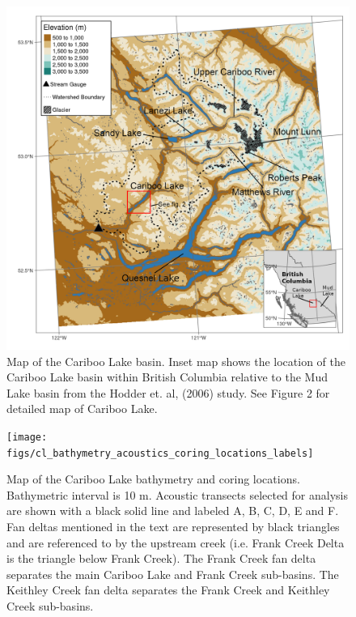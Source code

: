 \documentclass[Royal,times,doublespace,sageh]{sagej}
\begin{document}
\begin{figure}

{\centering \includegraphics[width=1\linewidth]{figs/cl_small_scale_inset_labels_gimp} 

}

\caption{Map of the Cariboo Lake basin. Inset map shows the location of the Cariboo Lake basin within British Columbia relative to the Mud Lake basin from the Hodder et. al, (2006) study. See Figure 2 for detailed map of Cariboo Lake.\label{fig:map-basin}}\label{fig:map-basin}
\end{figure}

\begin{figure}

{\centering \texttt{[image: figs/cl\_bathymetry\_acoustics\_coring\_locations\_labels]} 

}

\caption{Map of the Cariboo Lake bathymetry and coring locations. Bathymetric interval is 10 m. Acoustic transects selected for analysis are shown with a black solid line and labeled A, B, C, D, E and F. Fan deltas mentioned in the text are represented by black triangles and are referenced to by the upstream creek (i.e. Frank Creek Delta is the triangle below Frank Creek). The Frank Creek fan delta separates the main Cariboo Lake and Frank Creek sub-basins. The Keithley Creek fan delta separates the Frank Creek and Keithley Creek sub-basins.\label{fig:map-lake}}\label{fig:map-lake}
\end{figure}
\end{document}
